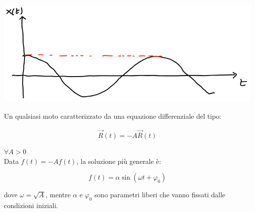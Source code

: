 \documentclass{article}
\begin{document}
\includegraphics[width=\columnwidth]{esempio-moto-armonico}

\noindent
Un qualsiasi moto caratterizzato da una equazione differenziale del tipo:

$$
\ddot{\vec{R}}(t) = -A\vec{R}(t)
$$

\noindent
$\forall A > 0$\\

\noindent
Data $\ddot{f}(t) = -Af(t)$, la soluzione più generale è:

$$
f(t) = \alpha \sin{(\omega t + \varphi_0)}
$$

\noindent
dove $\omega = \sqrt{A}$, mentre $\alpha$ e $\varphi_0$ sono parametri liberi che vanno fissati dalle condizioni iniziali.
\end{document}
